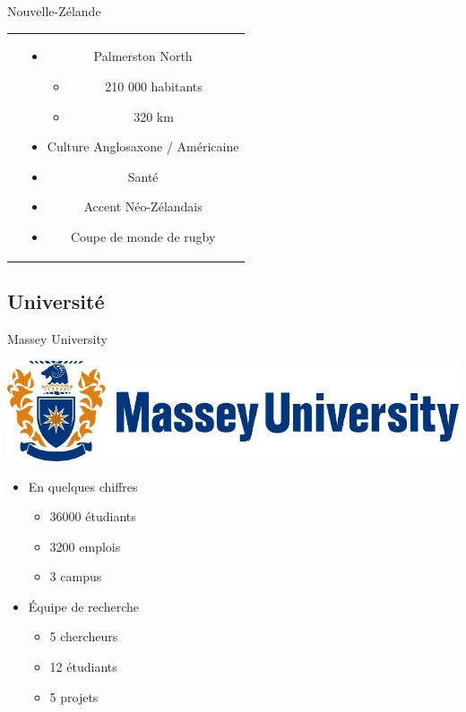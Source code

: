 \documentclass{beamer}
\begin{document}
\begin{frame}{Nouvelle-Zélande}
\begin{tabular}{c c}
&
\begin{minipage}{0.5\linewidth}
\begin{itemize}
\item Palmerston North
\begin{itemize}
\item 210 000 habitants
\item 320 km\up{2}
\end{itemize}
\item Culture Anglosaxone / Américaine
\item Santé
\item Accent Néo-Zélandais
\item Coupe de monde de rugby
\end{itemize}
\end{minipage}
\end{tabular}
\end{frame}



\subsection{Université}
\begin{frame}{Massey University}
\begin{center}
\includegraphics[width=0.65\linewidth]{images/logo-massey-university}
\begin{itemize}
\item En quelques chiffres
\begin{itemize}
\item 36000 étudiants
\item 3200 emplois
\item 3 campus
\end{itemize}
\vspace{5mm}
\item \'Equipe de recherche
\begin{itemize}
\item 5 chercheurs
\item 12 étudiants
\item 5 projets
\end{itemize}
\end{itemize}
\end{center}
\end{frame}
\end{document}
